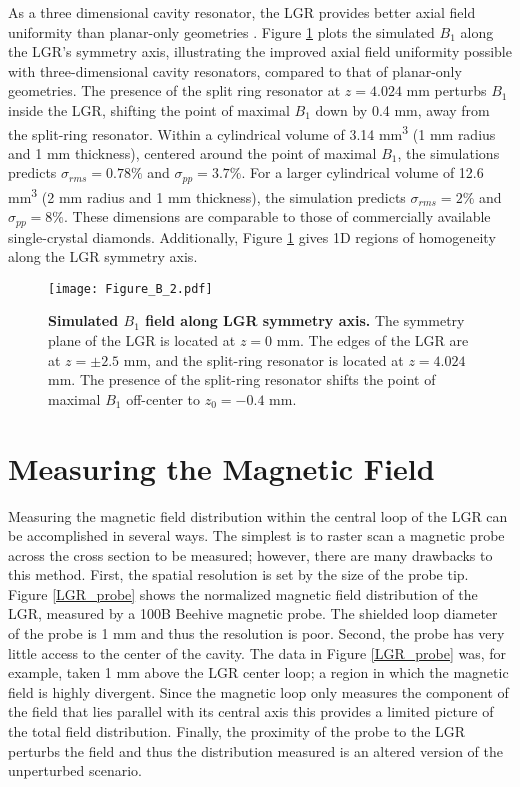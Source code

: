 As a three dimensional cavity resonator, the LGR provides better axial field uniformity than planar-only geometries \cite{floch2016towards,kapitanova2017dielectric,angerer2016collective}. Figure \ref{LGR_axial_simulated} plots the simulated $B_1$ along the LGR's symmetry axis, illustrating the improved axial field uniformity possible with three-dimensional cavity
resonators, compared to that of planar-only geometries. The presence of the split ring resonator at $z = 4.024$ mm perturbs $B_1$ inside the LGR, shifting the point of maximal $B_1$ down by 0.4 mm, away from the split-ring resonator. Within a cylindrical volume of 3.14 mm\textsuperscript{3} (1 mm radius and 1 mm thickness), centered around the point of maximal $B_1$, the simulations predicts $\sigma_{rms} = 0.78\%$ and $\sigma_{pp} = 3.7\%$. For a larger cylindrical volume of 12.6 mm\textsuperscript{3} (2 mm radius and 1 mm thickness), the simulation predicts $\sigma_{rms} = 2\%$ and $\sigma_{pp} = 8\%$. These dimensions are comparable to those of commercially available single-crystal diamonds. Additionally, Figure \ref{LGR_axial_simulated} gives 1D regions of homogeneity along the LGR symmetry axis.

\begin{figure}[t!]
\centering
\texttt{[image: Figure\_B\_2.pdf]}  
\caption{\textbf{Simulated $B_1$ field along LGR symmetry axis.} The symmetry plane of the LGR is located at $z = 0$ mm. The edges of the LGR are at $z = \pm 2.5$ mm, and the split-ring resonator is located at $z = 4.024$ mm. The presence of the split-ring resonator shifts the point of maximal $B_1$ off-center to $z_0 = -0.4$ mm.}
\label{LGR_axial_simulated}
\end{figure}

\section{Measuring the Magnetic Field} \label{field}

Measuring the magnetic field distribution within the central loop of the LGR can be accomplished in several ways. The simplest is to raster scan a magnetic probe across the cross section to be measured; however, there are many drawbacks to this method. First, the spatial resolution is set by the size of the probe tip. Figure \ref{LGR_probe} shows the normalized magnetic field distribution of the LGR, measured by a 100B Beehive magnetic probe. The shielded loop diameter of the probe is 1 mm and thus the resolution is poor. Second, the probe has very little access to the center of the cavity. The data in Figure \ref{LGR_probe} was, for example, taken 1 mm above the LGR center loop; a region in which the magnetic field is highly divergent. Since the magnetic loop only measures the component of the field that lies parallel with its central axis this provides a limited picture of the total field distribution. Finally, the proximity of the probe to the LGR perturbs the field and thus the distribution measured is an altered version of the unperturbed scenario. 


